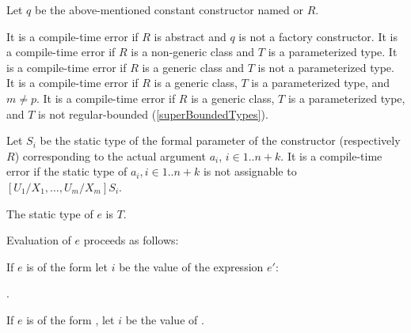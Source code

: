 \documentclass[makeidx]{article}
\begin{document}
{\LMHash{}%
Let $q$ be the above-mentioned constant constructor named  or $R$.

\LMHash{}%
It is a compile-time error if $R$ is abstract
and $q$ is not a factory constructor.
It is a compile-time error if $R$ is a non-generic class
and $T$ is a parameterized type.
It is a compile-time error if $R$ is a generic class
and $T$ is not a parameterized type.
It is a compile-time error if $R$ is a generic class,
$T$ is a parameterized type, and $m \not= p$.
It is a compile-time error if $R$ is a generic class,
$T$ is a parameterized type,
and $T$ is not regular-bounded
(\ref{superBoundedTypes}).

\LMHash{}%
Let $S_i$ be the static type of
the formal parameter of the constructor  (respectively $R$)
corresponding to the actual argument $a_i$, $i \in 1 .. n+k$.
It is a compile-time error if the static type of
$a_i, i \in 1 .. n + k$
is not assignable to $[U_1/X_1, \ldots, U_m/X_m]S_i$.

\LMHash{}%
The static type of $e$ is $T$.

\LMHash{}%
Evaluation of $e$ proceeds as follows:

\LMHash{}%
If $e$ is of the form
let $i$ be the value of the expression $e'$:

\noindent
{}.


\LMHash{}%
If $e$ is of the form
,
let $i$ be the value of
.

}
\end{document}
